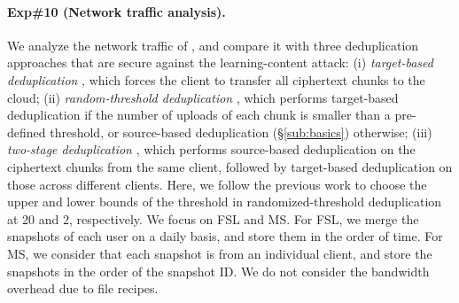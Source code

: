 \paragraph{Exp\#10 (Network traffic analysis).}
We analyze the network traffic of \prototype, and compare it with three deduplication approaches that are secure against the learning-content attack: (i) {\em target-based deduplication} \cite{harnik10}, which forces the client to transfer all ciphertext chunks to the cloud; (ii) {\em random-threshold deduplication} \cite{harnik10}, which performs target-based deduplication if the number of uploads of each chunk is smaller than a pre-defined threshold, or source-based deduplication (\S\ref{sub:basics}) otherwise; (iii) {\em two-stage deduplication} \cite{li15}, which performs source-based deduplication on the ciphertext chunks from the same client, followed by target-based deduplication on those across different clients. Here, we follow the previous work \cite{harnik10} to choose the upper and lower bounds of the threshold in randomized-threshold deduplication at 20 and 2, respectively. We focus on FSL and MS. For FSL, we merge the snapshots of each user on a daily basis, and store them in the order of time. For MS, we consider that each snapshot is from an individual client, and store the snapshots in the order of the snapshot ID.
We do not consider the bandwidth overhead due to file recipes.




